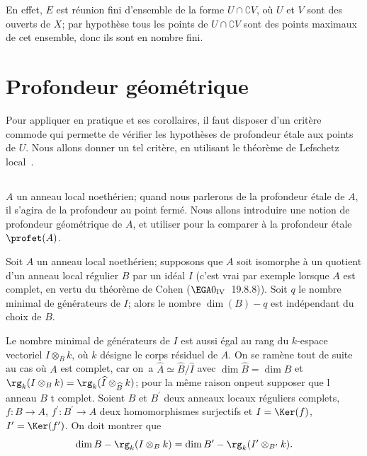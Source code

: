 En effet, $E$ est r\'eunion fini d'ensemble de la forme $U\cap\complement V$, o\`u $U$ et $V$ sont des ouverts de $X$; par hypoth\`ese tous les points de $U\cap\complement V$ sont des points maximaux de cet ensemble, donc ils sont en nombre fini.

\section{Profondeur g\'eom\'etrique} \label{XIV.5}

Pour appliquer en pratique  et ses corollaires, il faut disposer d'un crit\`ere commode qui permette de v\'erifier les hypoth\`eses de profondeur \'etale aux points de $U$. Nous allons donner un tel crit\`ere, en utilisant le th\'eor\`eme de Lefschetz local~.

\subsection{} \label{XIV.5.1}  $A$ un anneau local noeth\'erien; quand nous parlerons de la profondeur \'etale de $A$, il s'agira de la profondeur au point ferm\'e. Nous allons introduire une notion de \og profondeur g\'eom\'etrique de $A$\fg, et utiliser  pour la comparer \`a la profondeur \'etale $\profet(A)$.

\begin{proposition} \label{XIV.5.2} Soit $A$ un anneau local noeth\'erien; supposons que $A$ soit isomorphe \`a un quotient d'un anneau local r\'egulier $B$ par un id\'eal $I$ (c'est vrai par exemple lorsque $A$ est complet, en vertu du th\'eor\`eme de Cohen (\textup{$\EGA 0_{\textup{IV}}$~19.8.8})). Soit $q$ le nombre minimal de g\'en\'erateurs de $I$; alors le nombre $\dim(B)-q$ est ind\'ependant du choix de $B$.
\end{proposition}

Le nombre minimal de g\'en\'erateurs de $I$ est aussi \'egal au rang du $k$-espace vectoriel $I\otimes_{B}k$, o\`u $k$ d\'esigne le corps r\'esiduel de $A$. On se ram\`ene tout de suite au cas o\`u $A$ est complet, car on~a $\widehat{A}\simeq\widehat{B}/\widehat{I}$ avec $\dim \widehat{B}=\dim B$ et $\rg_{k}(I\otimes_{B}k)=\rg_{k}(\widehat{I}\otimes_{\widehat{B}}k)$; pour la m\^eme raison on\pageoriginale peut supposer que l anneau $B$ t complet. Soient $B$ et $B^{\prime}$ deux anneaux locaux r\'eguliers complets, $f\colon B\to A$, $f^{\prime}\colon B^{\prime}\to A$ deux homomorphismes surjectifs et $I=\Ker(f)$, $I^{\prime}=\Ker(f^{\prime})$. On doit montrer que
$$
\dim B-\rg_{k}(I\otimes_{B}k)=\dim B^{\prime}-\rg_{k}(I^{\prime}\otimes_{B^{\prime}}k).
$$

